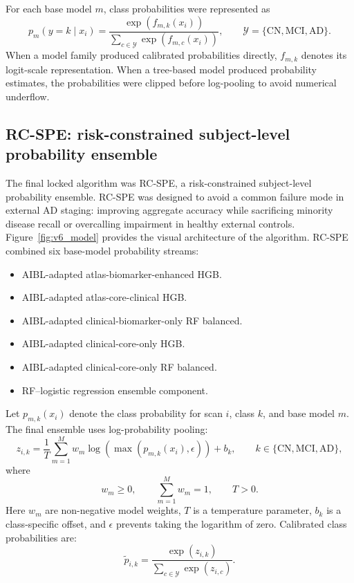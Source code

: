 \documentclass[12pt,a4paper]{article}
\begin{document}
For each base model $m$, class probabilities were represented as
\begin{equation}
p_m(y=k\mid x_i)=
\frac{\exp(f_{m,k}(x_i))}
{\sum_{c\in\mathcal{Y}}\exp(f_{m,c}(x_i))},
\qquad
\mathcal{Y}=\{\mathrm{CN},\mathrm{MCI},\mathrm{AD}\}.
\label{eq:base_prob}
\end{equation}
When a model family produced calibrated probabilities directly, $f_{m,k}$ denotes its logit-scale representation. When a tree-based model produced probability estimates, the probabilities were clipped before log-pooling to avoid numerical underflow.

\subsection{RC-SPE: risk-constrained subject-level probability ensemble}
\label{sec:model}

The final locked algorithm was RC-SPE, a risk-constrained subject-level probability ensemble. RC-SPE was designed to avoid a common failure mode in external AD staging: improving aggregate accuracy while sacrificing minority disease recall or overcalling impairment in healthy external controls. Figure~\ref{fig:v6_model} provides the visual architecture of the algorithm. RC-SPE combined six base-model probability streams:
\begin{itemize}[leftmargin=*,itemsep=2pt]
    \item AIBL-adapted atlas-biomarker-enhanced HGB.
    \item AIBL-adapted atlas-core-clinical HGB.
    \item AIBL-adapted clinical-biomarker-only RF balanced.
    \item AIBL-adapted clinical-core-only HGB.
    \item AIBL-adapted clinical-core-only RF balanced.
    \item RF--logistic regression ensemble component.
\end{itemize}

Let $p_{m,k}(x_i)$ denote the class probability for scan $i$, class $k$, and base model $m$. The final ensemble uses log-probability pooling:
\begin{equation}
z_{i,k} =
\frac{1}{T}\sum_{m=1}^{M} w_m
\log\left(\max(p_{m,k}(x_i), \epsilon)\right) + b_k ,
\qquad
k \in \{\mathrm{CN},\mathrm{MCI},\mathrm{AD}\},
\label{eq:v6_log_pool}
\end{equation}
where
\begin{equation}
w_m \geq 0,\qquad \sum_{m=1}^{M}w_m=1,\qquad T>0.
\label{eq:ensemble_constraints}
\end{equation}
Here $w_m$ are non-negative model weights, $T$ is a temperature parameter, $b_k$ is a class-specific offset, and $\epsilon$ prevents taking the logarithm of zero. Calibrated class probabilities are:
\begin{equation}
\tilde{p}_{i,k} =
\frac{\exp(z_{i,k})}
{\sum_{c\in\mathcal{Y}}\exp(z_{i,c})}.
\label{eq:v6_softmax}
\end{equation}
\end{document}
